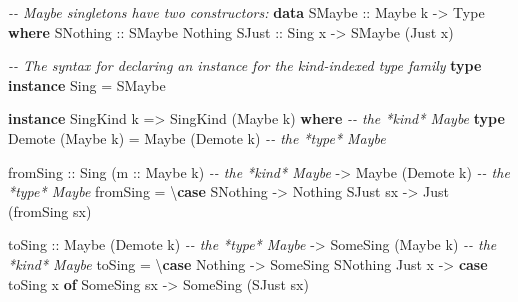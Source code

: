 \documentclass[]{article}
\newenvironment{Shaded}{}{}
\newcommand{\CommentTok}[1]{\textcolor[rgb]{0.38,0.63,0.69}{\textit{#1}}}
\newcommand{\DataTypeTok}[1]{\textcolor[rgb]{0.56,0.13,0.00}{#1}}
\newcommand{\KeywordTok}[1]{\textcolor[rgb]{0.00,0.44,0.13}{\textbf{#1}}}
\newcommand{\NormalTok}[1]{#1}
\newcommand{\OtherTok}[1]{\textcolor[rgb]{0.00,0.44,0.13}{#1}}
\begin{document}
\begin{Shaded}
\begin{Highlighting}[]
\CommentTok{{-}{-} Maybe singletons have two constructors:}
\KeywordTok{data} \DataTypeTok{SMaybe}\OtherTok{ ::} \DataTypeTok{Maybe}\NormalTok{ k }\OtherTok{{-}\textgreater{}} \DataTypeTok{Type} \KeywordTok{where}
    \DataTypeTok{SNothing}\OtherTok{ ::} \DataTypeTok{SMaybe} \DataTypeTok{\textquotesingle{}Nothing}
    \DataTypeTok{SJust}\OtherTok{    ::} \DataTypeTok{Sing}\NormalTok{ x }\OtherTok{{-}\textgreater{}} \DataTypeTok{SMaybe}\NormalTok{ (}\DataTypeTok{\textquotesingle{}Just}\NormalTok{ x)}

\CommentTok{{-}{-} The syntax for declaring an instance for the kind{-}indexed type family}
\KeywordTok{type} \KeywordTok{instance} \DataTypeTok{Sing} \OtherTok{=} \DataTypeTok{SMaybe}

\KeywordTok{instance} \DataTypeTok{SingKind}\NormalTok{ k }\OtherTok{=\textgreater{}} \DataTypeTok{SingKind}\NormalTok{ (}\DataTypeTok{Maybe}\NormalTok{ k) }\KeywordTok{where}     \CommentTok{{-}{-} the *kind* Maybe}
    \KeywordTok{type} \DataTypeTok{Demote}\NormalTok{ (}\DataTypeTok{Maybe}\NormalTok{ k) }\OtherTok{=} \DataTypeTok{Maybe}\NormalTok{ (}\DataTypeTok{Demote}\NormalTok{ k)        }\CommentTok{{-}{-} the *type* Maybe}

\NormalTok{    fromSing}
\OtherTok{        ::} \DataTypeTok{Sing}\NormalTok{ (}\OtherTok{m ::} \DataTypeTok{Maybe}\NormalTok{ k)        }\CommentTok{{-}{-} the *kind* Maybe}
        \OtherTok{{-}\textgreater{}} \DataTypeTok{Maybe}\NormalTok{ (}\DataTypeTok{Demote}\NormalTok{ k)           }\CommentTok{{-}{-} the *type* Maybe}
\NormalTok{    fromSing }\OtherTok{=}\NormalTok{ \textbackslash{}}\KeywordTok{case}
        \DataTypeTok{SNothing} \OtherTok{{-}\textgreater{}} \DataTypeTok{Nothing}
        \DataTypeTok{SJust}\NormalTok{ sx }\OtherTok{{-}\textgreater{}} \DataTypeTok{Just}\NormalTok{ (fromSing sx)}

\NormalTok{    toSing}
\OtherTok{        ::} \DataTypeTok{Maybe}\NormalTok{ (}\DataTypeTok{Demote}\NormalTok{ k)             }\CommentTok{{-}{-} the *type* Maybe}
        \OtherTok{{-}\textgreater{}} \DataTypeTok{SomeSing}\NormalTok{ (}\DataTypeTok{Maybe}\NormalTok{ k)           }\CommentTok{{-}{-} the *kind* Maybe}
\NormalTok{    toSing }\OtherTok{=}\NormalTok{ \textbackslash{}}\KeywordTok{case}
        \DataTypeTok{Nothing} \OtherTok{{-}\textgreater{}} \DataTypeTok{SomeSing} \DataTypeTok{SNothing}
        \DataTypeTok{Just}\NormalTok{ x  }\OtherTok{{-}\textgreater{}} \KeywordTok{case}\NormalTok{ toSing x }\KeywordTok{of}
          \DataTypeTok{SomeSing}\NormalTok{ sx }\OtherTok{{-}\textgreater{}} \DataTypeTok{SomeSing}\NormalTok{ (}\DataTypeTok{SJust}\NormalTok{ sx)}
\end{Highlighting}
\end{Shaded}
\end{document}
